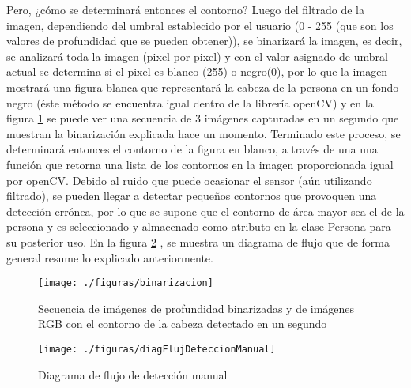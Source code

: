 \documentclass[a4paper,openright,12pt]{report}
\begin{document}
Pero, ¿cómo se determinará entonces el contorno? Luego del filtrado de la imagen, dependiendo del umbral establecido por el usuario (0 - 255 (que son los valores de profundidad que se pueden obtener)), se binarizará la imagen, es decir, se analizará toda la imagen (pixel por pixel) y con el valor asignado de umbral actual se determina si el pixel es blanco (255) o negro(0), por lo que la imagen mostrará una figura blanca que representará la cabeza de la persona en un fondo negro (éste método se encuentra igual dentro de la librería openCV) y en la figura \ref{fig:binarizacion} se puede ver una secuencia de 3 imágenes capturadas en un segundo que muestran la binarización explicada hace un momento. Terminado este proceso, se determinará entonces el contorno de la figura en blanco, a través de una una función que retorna una lista de los contornos en la imagen proporcionada igual por openCV. Debido al ruido que puede ocasionar el sensor (aún utilizando filtrado), se pueden llegar a detectar pequeños contornos que provoquen una detección errónea, por lo que se supone que el contorno de área mayor sea el de la persona y es seleccionado y almacenado como atributo en la clase Persona para su posterior uso. En la figura \ref{fig:diagFlujDeteccionManual} , se muestra un diagrama de flujo que de forma general resume lo explicado anteriormente.
\begin{figure}[ht]
	\centering
	\texttt{[image: ./figuras/binarizacion]}
	\caption[Secuencia de imágenes de profundidad binarizadas y de imágenes RGB en un segundo]{Secuencia de imágenes de profundidad binarizadas y de imágenes RGB con el contorno de la cabeza detectado en un segundo} \label{fig:binarizacion}
\end{figure}
\begin{figure}[ht]
	\centering
	\texttt{[image: ./figuras/diagFlujDeteccionManual]}
	\caption{Diagrama de flujo de detección manual} \label{fig:diagFlujDeteccionManual}
\end{figure}
\end{document}
